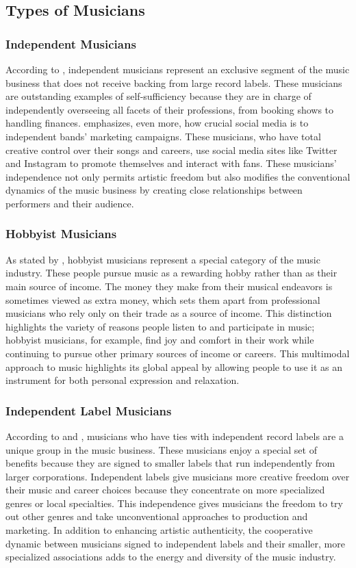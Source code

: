 \subsection{Types of Musicians}
\subsubsection{Independent Musicians}
According to \textcite{arditi21}, independent musicians represent an exclusive segment of the music business that does not receive backing from large record labels. These musicians are outstanding examples of self-sufficiency because they are in charge of independently overseeing all facets of their professions, from booking shows to handling finances. \textcite{martinez21} emphasizes, even more, how crucial social media is to independent bands' marketing campaigns. These musicians, who have total creative control over their songs and careers, use social media sites like Twitter and Instagram to promote themselves and interact with fans. These musicians' independence not only permits artistic freedom but also modifies the conventional dynamics of the music business by creating close relationships between performers and their audience.

\subsubsection{Hobbyist Musicians}
As stated by \textcite{arditi21}, hobbyist musicians represent a special category of the music industry. These people pursue music as a rewarding hobby rather than as their main source of income. The money they make from their musical endeavors is sometimes viewed as extra money, which sets them apart from professional musicians who rely only on their trade as a source of income. This distinction highlights the variety of reasons people listen to and participate in music; hobbyist musicians, for example, find joy and comfort in their work while continuing to pursue other primary sources of income or careers. This multimodal approach to music highlights its global appeal by allowing people to use it as an instrument for both personal expression and relaxation.

\subsubsection{Independent Label Musicians}
According to \textcite{arditi21} and \textcite{martinez21}, musicians who have ties with independent record labels are a unique group in the music business. These musicians enjoy a special set of benefits because they are signed to smaller labels that run independently from larger corporations. Independent labels give musicians more creative freedom over their music and career choices because they concentrate on more specialized genres or local specialties. This independence gives musicians the freedom to try out other genres and take unconventional approaches to production and marketing. In addition to enhancing artistic authenticity, the cooperative dynamic between musicians signed to independent labels and their smaller, more specialized associations adds to the energy and diversity of the music industry.

